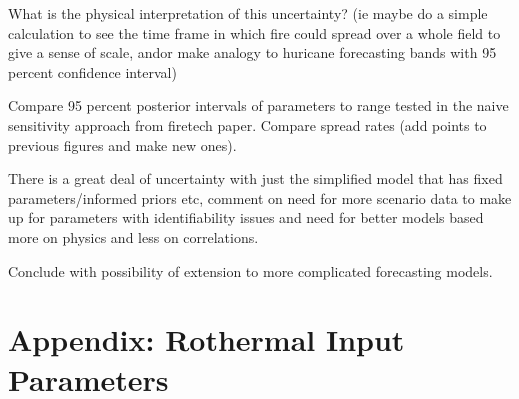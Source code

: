 \documentclass[11pt]{article}
\begin{document}

What is the physical interpretation of this uncertainty? (ie maybe do a simple calculation to see the time frame in which fire could spread over a whole field to give a sense of scale, andor make analogy to huricane forecasting bands with 95 percent confidence interval) 

Compare 95 percent posterior intervals of parameters to range tested in the naive sensitivity approach from firetech paper. Compare spread rates (add points to previous figures and make new ones).

There is a great deal of uncertainty with just the simplified model that has fixed parameters/informed priors etc, comment on need for more scenario data to make up for parameters with identifiability issues and need for better models based more on physics and less on correlations.

Conclude with possibility of extension to more complicated forecasting models.

\clearpage
\appendix
\section{Appendix: Rothermal Input Parameters}
\label{ap:table}
\end{document}
